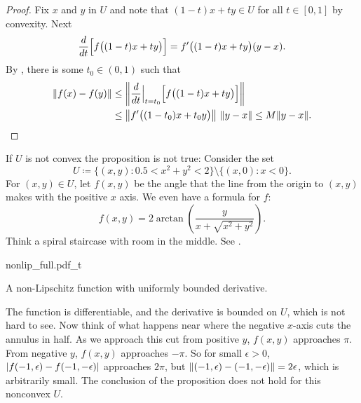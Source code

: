 \begin{proof}
Fix $x$ and $y$ in $U$ and note that
$(1-t)x+ty \in U$ for all $t \in [0,1]$
by convexity.
Next
\begin{equation*}
\frac{d}{dt} \Bigl[f\bigl((1-t)x+ty\bigr)\Bigr]
=
f'\bigl((1-t)x+ty\bigr) (y-x) .
\end{equation*}
By , there is some
$t_0 \in (0,1)$ such that
\begin{equation*}
\begin{split}
\lVert {f(x)-f(y)} \rVert & \leq
\left\lVert {\frac{d}{dt} \Big|_{t=t_0} \Bigl[ f\bigl((1-t)x+ty\bigr) \Bigr] } \right\rVert
\\
& \leq
\left\lVert {f'\bigl((1-t_0)x+t_0y\bigr)} \right\rVert \, \lVert {y-x} \rVert \leq
M \lVert {y-x} \rVert . \qedhere
\end{split}
\end{equation*}
\end{proof}

\begin{example}
If $U$ is not convex the proposition is not true: Consider
the set
\begin{equation*}
U \coloneqq \bigl\{ (x,y) : 0.5 < x^2+y^2 < 2 \bigr\}
\setminus \bigl\{ (x,0) : x < 0 \bigr\} .
\end{equation*}
For $(x,y) \in U$,
let $f(x,y)$ be the angle that the line from the origin to $(x,y)$
makes with the positive $x$ axis.  We even have a formula for $f$:
\begin{equation*}
f(x,y) = 2 \operatorname{arctan}\left( \frac{y}{x+\sqrt{x^2+y^2}}\right) .
\end{equation*}
Think a spiral staircase with room in the middle.  See
.

\begin{myfigureht}
{nonlip_full.pdf_t}
\caption{A non-Lipschitz function with uniformly bounded
derivative.\label{mv:fignonlip}}
\end{myfigureht}

The function is differentiable,
and the derivative is bounded on $U$, which is not hard to see.   Now
think of
what happens near where the negative $x$-axis cuts the annulus in half.
As we approach this cut from positive $y$, $f(x,y)$ approaches $\pi$.
From negative $y$, $f(x,y)$ approaches $-\pi$.
So for small $\epsilon > 0$, $\lvert {f(-1,\epsilon)-f(-1,-\epsilon)} \rvert$
approaches $2\pi$, but $\lVert {(-1,\epsilon)-(-1,-\epsilon)} \rVert = 2\epsilon$,
which is arbitrarily small.  The conclusion of the proposition does not
hold for this nonconvex $U$.
\end{example}


